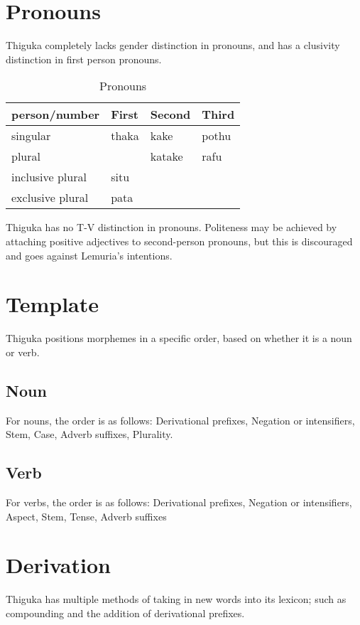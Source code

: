 \section{Pronouns}
Thiguka completely lacks gender distinction in pronouns, and has a clusivity distinction in first person pronouns.

\begin{table}[h!]
    \centering
    \caption{Pronouns}
    \begin{tabularx}{15cm}{|X|X|X|X|}
        \hline
        person/number & \textbf{First} & \textbf{Second} & \textbf{Third} \\
        \hline
        singular & thaka & kake & pothu \\
        plural   & & katake & rafu \\
        inclusive plural & situ & & \\
        exclusive plural & pata & & \\
        \hline
    \end{tabularx}
\end{table}

Thiguka has no T-V distinction in pronouns. Politeness may be achieved by attaching positive adjectives to second-person pronouns, but this is discouraged and goes against Lemuria's intentions.



\section{Template}
Thiguka positions morphemes in a specific order, based on whether it is a noun or verb.

\subsection{Noun}
For nouns, the order is as follows: Derivational prefixes, Negation or intensifiers, Stem, Case, Adverb suffixes, Plurality.

\subsection{Verb}
For verbs, the order is as follows: Derivational prefixes, Negation or intensifiers, Aspect, Stem, Tense, Adverb suffixes

\section{Derivation}
Thiguka has multiple methods of taking in new words into its lexicon; such as compounding and the addition of derivational prefixes.

